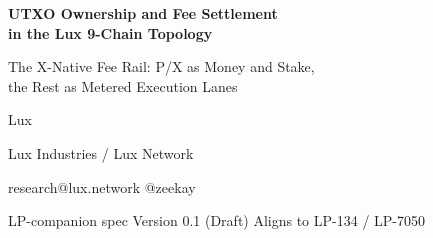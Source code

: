 \documentclass[11pt,letterpaper]{article}
\newcommand{\chain}[1]{\textsf{#1}}
\begin{document}
\begin{titlepage}
\vspace*{2cm}
\begin{center}
{\LARGE\bfseries UTXO Ownership and Fee Settlement\\in the Lux 9-Chain Topology\par}
\vspace{0.8em}
{\large The \chain{X}-Native Fee Rail: \chain{P}/\chain{X} as Money and Stake,\\the Rest as Metered Execution Lanes\par}
\vspace{2cm}
{\large Lux}\par
\vspace{0.3em}
{Lux Industries / Lux Network}\par
{\small research@lux.network \quad @zeekay}\par
\vspace{2cm}
{\small LP-companion spec \quad\textbullet\quad Version 0.1 (Draft) \quad\textbullet\quad Aligns to LP-134 / LP-7050}\par
\end{center}
\begin{abstract}
\noindent The canonical Lux topology is nine orthogonal chains ---
\chain{P} \chain{C} \chain{X} \chain{Q} \chain{Z} \chain{A} \chain{B} \chain{M}
\chain{F} (LP-134). This note fixes the \emph{economic} invariants that keep
that topology clean: which chains own canonical asset state, and how fees flow.
The rule is deliberately narrow. Only \chain{P} and \chain{X} are canonical
UTXO state machines: \chain{P} is the validator/stake/control-plane ledger and
\chain{X} is the asset/settlement/payment ledger. \chain{X} is additionally the
canonical fee asset. Every other chain (\chain{C} \chain{D} \chain{Q} \chain{Z}
\chain{A} \chain{B} \chain{M} \chain{F}) is a domain-specific execution lane
that holds VM-local state plus an \chain{X}-funded fee balance, meters its own
work, and settles rewards and remainders back to \chain{X} (with validator
economics accounted on \chain{P}). We give the fee-funding model (per-user
\chain{X} import/export plus per-chain fee-root settlement, finalized on
\chain{Q}), a per-chain fee policy, and seven conservation invariants that
prevent any lane from silently becoming a second asset ledger. Shielded state on
\chain{Z} and encrypted balances on \chain{F} are UTXO-\emph{like} in form but
are explicitly \emph{not} the canonical transparent \chain{X} set --- they are
commitments over \chain{X}-backed assets and must prove conservation against it.
\end{abstract}
\end{titlepage}
\end{document}
